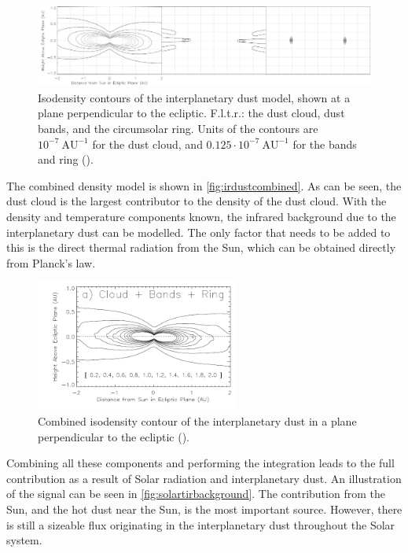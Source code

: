 \begin{figure}[htbp]
 \centering
 \includegraphics[width=1.0\textwidth]{img/ir_dust_components.png}
 \caption{Isodensity contours of the interplanetary dust model, shown at a plane perpendicular to the ecliptic. F.l.t.r.: the dust cloud, dust bands, and the circumsolar ring. Units of the contours are $10^{-7} ~\mathrm{AU}^{-1}$ for the dust cloud, and $0.125\cdot10^{-7} ~\mathrm{AU}^{-1}$ for the bands and ring (\cite{IRDust}).}
 \label{fig:irdustcontributions}
\end{figure}

The combined density model is shown in \autoref{fig:irdustcombined}. As can be seen, the dust cloud is the largest contributor to the density of the dust cloud. With the density and temperature components known, the infrared background due to the interplanetary dust can be modelled. The only factor that needs to be added to this is the direct thermal radiation from the Sun, which can be obtained directly from Planck's law. \\

\begin{figure}[htbp]
 \centering
 \includegraphics[width=0.6\textwidth]{img/ir_dust_combined.png}
 \caption{Combined isodensity contour of the interplanetary dust in a plane perpendicular to the ecliptic (\cite{IRDust}).}
 \label{fig:irdustcombined}
\end{figure}

Combining all these components and performing the integration leads to the full contribution as a result of Solar radiation and interplanetary dust. An illustration of the signal can be seen in \autoref{fig:solartirbackground}. The contribution from the Sun, and the hot dust near the Sun, is the most important source. However, there is still a sizeable flux originating in the interplanetary dust throughout the Solar system.\\

